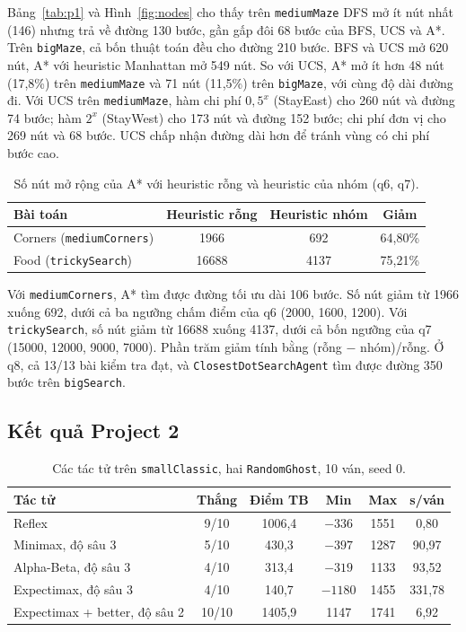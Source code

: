 \documentclass[conference]{IEEEtran}
\begin{document}
Bảng~\ref{tab:p1} và Hình~\ref{fig:nodes} cho thấy trên \texttt{mediumMaze} DFS mở ít nút nhất (146) nhưng trả về đường 130 bước, gần gấp đôi 68 bước của BFS, UCS và A*. Trên \texttt{bigMaze}, cả bốn thuật toán đều cho đường 210 bước. BFS và UCS mở 620 nút, A* với heuristic Manhattan mở 549 nút. So với UCS, A* mở ít hơn 48 nút (17,8\%) trên \texttt{mediumMaze} và 71 nút (11,5\%) trên \texttt{bigMaze}, với cùng độ dài đường đi. Với UCS trên \texttt{mediumMaze}, hàm chi phí $0{,}5^{x}$ (StayEast) cho 260 nút và đường 74 bước; hàm $2^{x}$ (StayWest) cho 173 nút và đường 152 bước; chi phí đơn vị cho 269 nút và 68 bước. UCS chấp nhận đường dài hơn để tránh vùng có chi phí bước cao.

\begin{table}[!ht]
    \centering
    \scriptsize
    \setlength{\tabcolsep}{4pt}
    \caption{Số nút mở rộng của A* với heuristic rỗng và heuristic của nhóm (q6, q7).}
    \label{tab:heur}
    \begin{tabular}{lccc}
    \toprule
    Bài toán & Heuristic rỗng & Heuristic nhóm & Giảm \\
    \midrule
    Corners (\texttt{mediumCorners}) & 1966 & 692 & 64,80\% \\
    Food (\texttt{trickySearch}) & 16688 & 4137 & 75,21\% \\
    \bottomrule
    \end{tabular}
\end{table}

Với \texttt{mediumCorners}, A* tìm được đường tối ưu dài 106 bước. Số nút giảm từ 1966 xuống 692, dưới cả ba ngưỡng chấm điểm của q6 (2000, 1600, 1200). Với \texttt{trickySearch}, số nút giảm từ 16688 xuống 4137, dưới cả bốn ngưỡng của q7 (15000, 12000, 9000, 7000). Phần trăm giảm tính bằng (rỗng $-$ nhóm)/rỗng. Ở q8, cả 13/13 bài kiểm tra đạt, và \texttt{ClosestDotSearchAgent} tìm được đường 350 bước trên \texttt{bigSearch}.

\subsection{Kết quả Project 2}
\begin{table}[!ht]
    \centering
    \scriptsize
    \setlength{\tabcolsep}{3pt}
    \caption{Các tác tử trên \texttt{smallClassic}, hai \texttt{RandomGhost}, 10 ván, seed 0.}
    \label{tab:p2}
    \begin{tabular}{lccccc}
    \toprule
    Tác tử & Thắng & Điểm TB & Min & Max & s/ván \\
    \midrule
    Reflex & 9/10 & 1006,4 & $-336$ & 1551 & 0,80 \\
    Minimax, độ sâu 3 & 5/10 & 430,3 & $-397$ & 1287 & 90,97 \\
    Alpha-Beta, độ sâu 3 & 4/10 & 313,4 & $-319$ & 1133 & 93,52 \\
    Expectimax, độ sâu 3 & 4/10 & 140,7 & $-1180$ & 1455 & 331,78 \\
    Expectimax + better, độ sâu 2 & 10/10 & 1405,9 & 1147 & 1741 & 6,92 \\
    \bottomrule
    \end{tabular}
\end{table}
\end{document}
